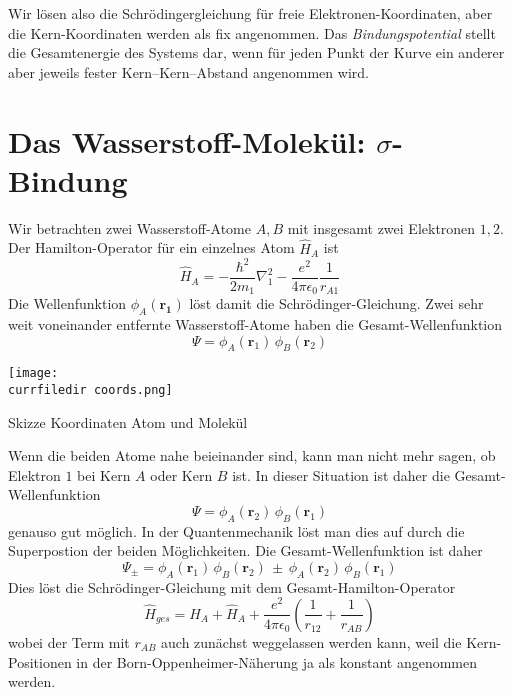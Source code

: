 Wir lösen also die Schrödingergleichung für freie Elektronen-Koordinaten, aber die Kern-Koordinaten werden als fix angenommen. Das \emph{Bindungspotential} stellt die Gesamtenergie des Systems dar, wenn für jeden Punkt der Kurve ein anderer aber jeweils fester Kern--Kern--Abstand angenommen wird.

\section{Das Wasserstoff-Molekül: $\sigma$-Bindung}


Wir betrachten zwei Wasserstoff-Atome $A,B$ mit insgesamt zwei Elektronen $1,2$. Der Hamilton-Operator für ein einzelnes Atom $\hat{H}_A$ ist
\begin{equation}
  \hat{H}_A = - \frac{\hbar^2}{2 m_1} \nabla_1^2 - \frac{e^2}{4 \pi \epsilon_0} \frac{1}{r_{A1}}
\end{equation}
Die Wellenfunktion $\phi_A(\mathbf{r_1})$ löst damit die Schrödinger-Gleichung. Zwei sehr weit voneinander entfernte Wasserstoff-Atome haben die Gesamt-Wellenfunktion
\begin{equation}
 \Psi = \phi_A(\mathbf{r}_1) \, \phi_B(\mathbf{r}_2)
\end{equation}
%
\begin{marginfigure}
\texttt{[image: \\currfiledir coords.png]}
\caption{Skizze Koordinaten Atom und Molekül}
\end{marginfigure}
%
Wenn die beiden Atome nahe beieinander sind, kann man nicht mehr sagen, ob Elektron $1$ bei Kern $A$ oder Kern $B$ ist. In dieser Situation ist daher die Gesamt-Wellenfunktion 
\begin{equation}
 \Psi = \phi_A(\mathbf{r}_2) \, \phi_B(\mathbf{r}_1)
\end{equation}
genauso gut möglich. In der Quantenmechanik löst man dies auf durch die Superpostion der beiden Möglichkeiten. Die Gesamt-Wellenfunktion  ist daher 
\begin{equation}
 \Psi_{\pm} = \phi_A(\mathbf{r}_1) \, \phi_B(\mathbf{r}_2) \, \pm \, \phi_A(\mathbf{r}_2) \, \phi_B(\mathbf{r}_1)
\end{equation}
Dies löst die Schrödinger-Gleichung mit dem Gesamt-Hamilton-Operator
\begin{equation}
  \hat{H}_{ges} =  \hat{H}_A + \hat{H}_A  + \frac{e^2}{4 \pi \epsilon_0} \left( \frac{1}{r_{12}} + \frac{1}{r_{AB}} \right)
\end{equation}
wobei der Term mit $r_{AB}$ auch zunächst weggelassen werden kann, weil die Kern-Positionen in der Born-Oppenheimer-Näherung ja als konstant angenommen werden.



